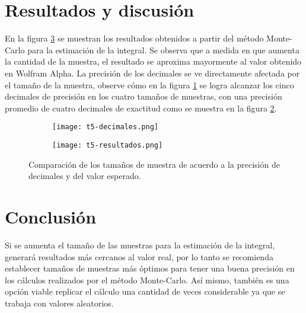 \documentclass[12pt]{amsart}
\begin{document}
\section{Resultados y discusión}
En la figura \ref{fig2} se muestran los resultados obtenidos a partir del método Monte-Carlo para la estimación de la integral. Se observa que a medida en que aumenta la cantidad de la muestra, el resultado se aproxima mayormente al valor obtenido en Wolfram Alpha. La precisión de los decimales se ve directamente afectada por el tamaño de la muestra, observe cómo en la figura \ref{2a} se logra alcanzar los cinco decimales de precisión en los cuatro tamaños de muestras, con una precisión promedio de cuatro decimales de exactitud como se muestra en la figura \ref{2b}.

\begin{figure}[h!]
\centering
\begin{subfigure}[H]{0.45\linewidth}
\texttt{[image: t5-decimales.png]}
\caption{}
\label{2a}
\end{subfigure}
\begin{subfigure}[H]{0.45\linewidth}
\texttt{[image: t5-resultados.png]}
\caption{}
\label{2b}
\end{subfigure}
\caption{Comparación de los tamaños de muestra de acuerdo a la precisión de decimales y del valor esperado.}
\label{fig2}
\end{figure}
\newpage
\section{Conclusión}
Si se aumenta el tamaño de las muestras para la estimación de la integral, generará resultados más cercanos al valor real, por lo tanto se recomienda establecer tamaños de muestras más óptimos para tener una buena precisión en los cálculos realizados por el método Monte-Carlo. Así mismo, también es una opción viable replicar el cálculo una cantidad de veces considerable ya que se trabaja con valores aleatorios.
\end{document}
